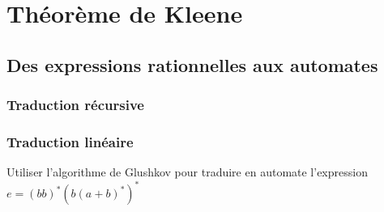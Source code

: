\chapter{Théorème de Kleene}
\label{hierarchie}

\section{Des expressions rationnelles aux automates}

\subsection{Traduction récursive}

\subsection{Traduction linéaire}



\begin{exercice}
Utiliser l'algorithme de Glushkov pour traduire en automate l'expression \newline $e = (bb)^*(b(a+b)^*)^*$
\end{exercice}

